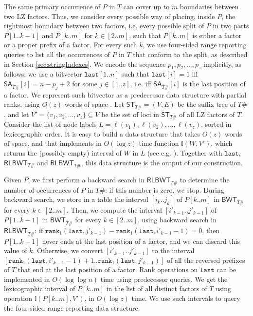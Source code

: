 \documentclass[a4paper,UKenglish]{lipics-v2016}
\newcommand{\REV}[1]{\ensuremath{\overline{#1}}}
\newcommand{\RLBWT}{\ensuremath{\mathsf{RLBWT}}}
\newcommand{\ST}{\ensuremath{\mathsf{ST}}}
\newcommand{\SA}{\ensuremath{\mathsf{SA}}}
\newcommand{\BWT}{\ensuremath{\mathsf{BWT}}}
\newcommand{\INTERVALFUNCTION}{\ensuremath{\mathbb{I}}}
\begin{document}
The same primary occurrence of $P$ in $T$ can cover up to $m$ boundaries between two LZ factors. Thus, we consider every possible way of placing, inside $P$, the rightmost boundary between two factors, i.e. every possible split of $P$ in two parts $P[1..k-1]$ and $P[k..m]$ for $k \in [2..m]$, such that $P[k..m]$ is either a factor or a proper prefix of a factor. For every such $k$, we use four-sided range reporting queries to list all the occurrences of $P$ in $T$ that conform to the split, as described in Section \ref{sec:stringIndexes}. We encode the sequence $p_1,p_2,\dots,p_z$ implicitly, as follows: we use a bitvector $\mathtt{last}[1..n]$ such that $\mathtt{last}[i]=1$ iff $\SA_{\REV{T}\#}[i]=n-p_j+2$ for some $j \in [1..z]$, i.e. iff $\SA_{\REV{T}\#}[i]$ is the last position of a factor. We represent such bitvector as a predecessor data structure with partial ranks, using $O(z)$ words of space \cite{Wi83}. Let $\ST_{T\#} = (V,E)$ be the suffix tree of $T\#$, and let $V'=\{v_1,v_2,\dots,v_z\} \subseteq V$ be the set of loci in $\ST_{T\#}$ of all LZ factors of $T$. Consider the list of node labels $L = \ell(v_1),\ell(v_2),\dots,\ell(v_z)$, sorted in lexicographic order. It is easy to build a data structure that takes $O(z)$ words of space, and that implements in $O(\log{z})$ time function $\INTERVALFUNCTION(W,V')$, which returns the (possibly empty) interval of $W$ in $L$ (see e.g. \cite{belazzougui2015composite}). Together with $\mathtt{last}$, $\RLBWT_{T\#}$ and $\RLBWT_{\REV{T}\#}$, this data structure is the output of our construction.

Given $P$, we first perform a backward search in $\RLBWT_{T\#}$ to determine the number of occurrences of $P$ in $T\#$: if this number is zero, we stop. During backward search, we store in a table the interval $[i_k..j_k]$ of $P[k..m]$ in $\BWT_{T\#}$ for every $k \in [2..m]$. Then, we compute the interval $[i'_{k-1}..j'_{k-1}]$ of $\REV{P[1..k-1]}$ in $\BWT_{\REV{T}\#}$ for every $k \in [2..m]$, using backward search in $\RLBWT_{\REV{T}\#}$: if $\mathtt{rank}_{1}(\mathtt{last},j'_{k-1}) - \mathtt{rank}_{1}(\mathtt{last},i'_{k-1}-1) = 0$, then $P[1..k-1]$ never ends at the last position of a factor, and we can discard this value of $k$. Otherwise, we convert $[i'_{k-1}..j'_{k-1}]$ to the interval $[\mathtt{rank}_{1}(\mathtt{last},i'_{k-1}-1)+1 .. \mathtt{rank}_{1}(\mathtt{last},j'_{k-1})]$ of all the reversed prefixes of $T$ that end at the last position of a factor. Rank operations on $\mathtt{last}$ can be implemented in $O(\log{\log{n}})$ time using predecessor queries. We get the lexicographic interval of $P[k..m]$ in the list of all distinct factors of $T$ using operation $\INTERVALFUNCTION(P[k..m],V')$, in $O(\log z)$ time. We use such intervals to query the four-sided range reporting data structure.
\end{document}
